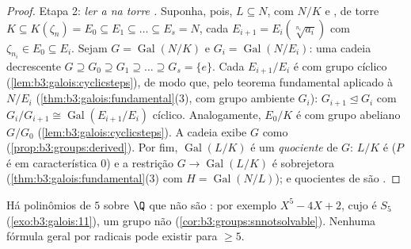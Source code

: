 \begin{proof}
Etapa 2: \emph{ler a  na torre .} Suponha, pois,
$L \subseteq N$, com $N/K$  e , de torre $K
\subseteq K(\zeta_n) = E_0 \subseteq E_1 \subseteq \dots
\subseteq E_s = N$, cada $E_{i+1} = E_i(\sqrt[n_i]{a_i})$
com $\zeta_{n_i} \in E_0 \subseteq E_i$. Sejam $G =
\operatorname{Gal}(N/K)$ e $G_i = \operatorname{Gal}(N/E_i)$: uma cadeia decrescente $G \supseteq G_0 \supseteq G_1 \supseteq
\dots \supseteq G_s = \{e\}$. Cada
$E_{i+1}/E_i$ é  com grupo cíclico (\cref{lem:b3:galois:cyclicsteps}), de modo que, pelo
teorema fundamental aplicado à  $N/E_i$
(\cref{thm:b3:galois:fundamental}(3), com grupo ambiente $G_i$): $G_{i+1} \trianglelefteq G_i$ com $G_i/G_{i+1} \cong
\operatorname{Gal}(E_{i+1}/E_i)$
cíclico. Analogamente, $E_0/K$ é  com grupo abeliano
$G/G_0$ (\cref{lem:b3:galois:cyclicsteps}). A cadeia exibe $G$ como 
(\cref{prop:b3:groups:derived}). Por fim, $\operatorname{Gal}(L/K)$ é um \emph{quociente} de $G$:
$L/K$ é  ($P$ é  em característica $0$) e
a restrição $G
\to \operatorname{Gal}(L/K)$ é sobrejetora (\cref{thm:b3:galois:fundamental}(3) com $H =
\operatorname{Gal}(N/L)$); e
quocientes de  são .
\end{proof}

\begin{corollary}
\label{cor:b3:galois:quintic}
Há polinômios de  $5$ sobre $\Q$ que não são : por exemplo $X^5 - 4X + 2$, cujo  é $S_5$
(\cref{exo:b3:galois:11}), um grupo não  (\cref{cor:b3:groups:snnotsolvable}). Nenhuma
fórmula geral por radicais pode existir para 
$\geq 5$.
\end{corollary}

